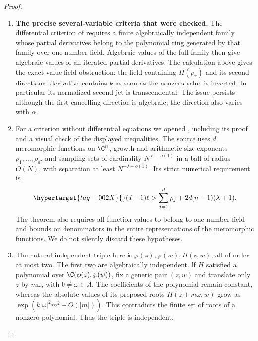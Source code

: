 \begin{proof}
\begin{enumerate}[label=\arabic*.,leftmargin=*]
\item \textbf{The precise several-variable criteria that were checked.}
The differential criterion of
\citet[Theorems 3.6 and 3.7]{waldschmidt2009auxiliary}
requires a finite algebraically independent family whose
partial derivatives belong to the polynomial ring generated
by that family over one number field. Algebraic values of
the full family then give algebraic values of all iterated
partial derivatives. The calculation above gives the exact value-field obstruction:
the field containing $H(p_\alpha)$ and its second directional
derivative contains $k$ as soon as the nonzero value is inverted.
In particular its normalized second jet is transcendental. The issue persists
although the first cancelling direction is algebraic; the
direction also varies with $\alpha$.

\item For a criterion without differential equations we opened
\citet[Theorem 1, p.~24]{waldschmidt1975dimension}, including
its proof and a visual check of the displayed inequalities.
The source uses $d$ meromorphic functions on $\C^n$, growth and
arithmetic-size exponents $\rho_1,\ldots,\rho_d$, and sampling
sets of cardinality $N^{\ell-o(1)}$ in a ball of radius $O(N)$,
with separation at least $N^{-\lambda-o(1)}$. Its strict numerical
requirement is
\begin{equation}\hypertarget{tag-002X}{}\label{ari:eq:cc-rankcriterion}
 (d-1)\ell>\sum_{j=1}^d\rho_j
                     +2d(n-1)(\lambda+1).
\end{equation}
The theorem also requires all function values to belong to
one number field and bounds on denominators in the entire
representations of the meromorphic functions. We do not
silently discard these hypotheses.

\item The natural independent triple here is
$\wp(z),\wp(w),H(z,w)$, all of order at most two.
The first two are algebraically independent. If $H$ satisfied
a polynomial over $\C(\wp(z),\wp(w))$, fix a generic pair
$(z,w)$ and translate only $z$ by $m\omega$, with
$0\ne\omega\in\Lambda$. The coefficients of the polynomial
remain constant, whereas the absolute values of its proposed
roots $H(z+m\omega,w)$ grow as
$\exp(k|\omega|^2m^2+O(|m|))$. This contradicts the finite
set of roots of a nonzero polynomial. Thus the triple is
independent.


\end{enumerate}
\end{proof}
